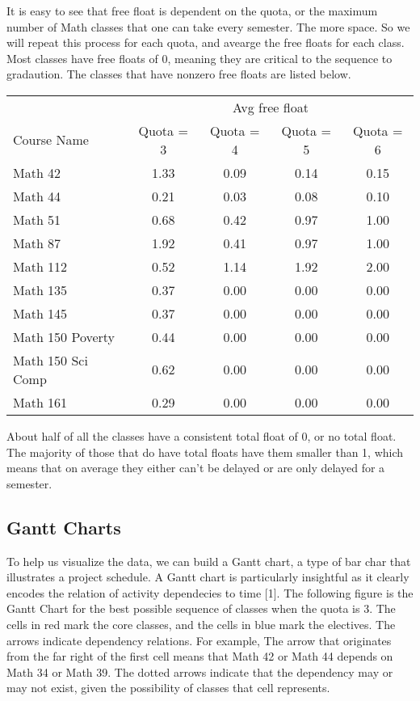\documentclass[11pt, oneside]{article}
\begin{document}
It is easy to see that free float is dependent on the quota, or the maximum number of Math classes that one can take every semester. The more space. So we will repeat this process for each quota, and avearge the free floats for each class. Most classes have free floats of 0, meaning they are critical to the sequence to gradaution. The classes that have nonzero free floats are listed below.

\begin{center}
    \begin{tabular}{|l | c | c | c | c |}
    \toprule
    & \multicolumn{4}{|c|}{Avg free float}   \\
    Course Name         & Quota = 3 & Quota = 4 & Quota = 5 & Quota = 6 \\ 
    \midrule
    Math 42              & 1.33 & 0.09 & 0.14 & 0.15 \\
    Math 44              & 0.21 & 0.03 & 0.08 & 0.10 \\
    Math 51              & 0.68 & 0.42 & 0.97 & 1.00\\
    Math 87              & 1.92 & 0.41 & 0.97 & 1.00\\
    Math 112             & 0.52 & 1.14 & 1.92 & 2.00\\
    Math 135             & 0.37 & 0.00 & 0.00 & 0.00 \\ 
    Math 145             & 0.37 & 0.00 & 0.00& 0.00 \\ 
    Math 150 Poverty     & 0.44 & 0.00 & 0.00& 0.00 \\ 
    Math 150 Sci Comp    & 0.62 & 0.00 & 0.00& 0.00 \\ 
    Math 161             & 0.29 & 0.00 & 0.00& 0.00 \\ 
    \bottomrule
    \end{tabular}
\end{center}
About half of all the classes have a consistent total float of 0, or no total float. The majority of those that do have total floats have them smaller than 1, which means that on average they either can't be delayed or are only delayed for a semester. 

\subsection{Gantt Charts}
To help us visualize the data, we can build a Gantt chart, a type of bar char that illustrates a project schedule. A Gantt chart is particularly insightful as it clearly encodes the relation of activity dependecies to time [1].
The following figure is the Gantt Chart for the best possible sequence of classes when the quota is 3. The cells in red mark the core classes, and the cells in blue mark the electives. The arrows indicate dependency relations. For example, The arrow that originates from the far right of the first cell means that Math 42 or Math 44 depends on Math 34 or Math 39. The dotted arrows indicate that the dependency may or may not exist, given the possibility of classes that cell represents.
\end{document}
